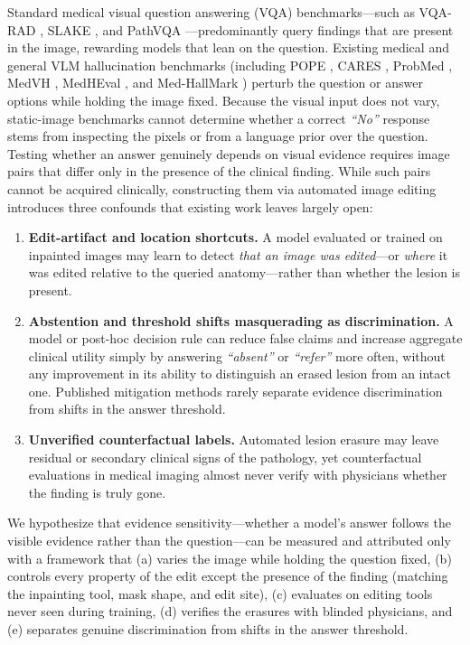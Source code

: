 \documentclass[5p,times,twocolumn,authoryear]{elsarticle}
\begin{document}
Standard medical visual question answering (VQA) benchmarks---such as VQA-RAD \citep{lau2018vqarad}, SLAKE \citep{liu2021slake}, and PathVQA \citep{he2020pathvqa}---predominantly query findings that are present in the image, rewarding models that lean on the question. Existing medical and general VLM hallucination benchmarks (including POPE \citep{li2023pope}, CARES \citep{xia2024cares}, ProbMed \citep{yan2024probmed}, MedVH \citep{gu2024medvh}, MedHEval \citep{chang2024medheval}, and Med-HallMark \citep{chen2024medhallmark}) perturb the question or answer options while holding the image fixed. Because the visual input does not vary, static-image benchmarks cannot determine whether a correct \emph{``No''} response stems from inspecting the pixels or from a language prior over the question. Testing whether an answer genuinely depends on visual evidence requires image pairs that differ only in the presence of the clinical finding. While such pairs cannot be acquired clinically, constructing them via automated image editing introduces three confounds that existing work leaves largely open:
\begin{enumerate}[leftmargin=*,nosep]
    \item \textbf{Edit-artifact and location shortcuts.} A model evaluated or trained on inpainted images may learn to detect \emph{that an image was edited}---or \emph{where} it was edited relative to the queried anatomy---rather than whether the lesion is present.
    \item \textbf{Abstention and threshold shifts masquerading as discrimination.} A model or post-hoc decision rule can reduce false claims and increase aggregate clinical utility simply by answering \emph{``absent''} or \emph{``refer''} more often, without any improvement in its ability to distinguish an erased lesion from an intact one. Published mitigation methods rarely separate evidence discrimination from shifts in the answer threshold.
    \item \textbf{Unverified counterfactual labels.} Automated lesion erasure may leave residual or secondary clinical signs of the pathology, yet counterfactual evaluations in medical imaging almost never verify with physicians whether the finding is truly gone.
\end{enumerate}

We hypothesize that evidence sensitivity---whether a model's answer follows the visible evidence rather than the question---can be measured and attributed only with a framework that (a) varies the image while holding the question fixed, (b) controls every property of the edit except the presence of the finding (matching the inpainting tool, mask shape, and edit site), (c) evaluates on editing tools never seen during training, (d) verifies the erasures with blinded physicians, and (e) separates genuine discrimination from shifts in the answer threshold.
\end{document}
